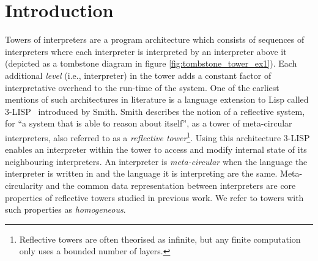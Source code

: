 \documentclass[sigplan,anonymous,review]{acmart}
\theoremstyle{definition}
\begin{document}



\maketitle

\section{Introduction}
Towers of interpreters are a program architecture which consists of sequences of interpreters where each interpreter is interpreted by an interpreter above it (depicted as a tombstone diagram in figure \ref{fig:tombstone_tower_ex1}). Each additional \textit{level} (i.e., interpreter) in the tower adds a constant factor of interpretative overhead to the run-time of the system. One of the earliest mentions of such architectures in literature is a language extension to Lisp called 3-LISP~\cite{smith1984reflection} introduced by Smith. Smith describes the notion of a reflective system, for ``a system that is able to reason
about itself'', as a tower of meta-circular interpreters, also referred to as a \textit{reflective tower}\footnote{
Reflective towers are often theorised as infinite, but any finite
computation only uses a bounded number of layers.}.
Using this architecture 3-LISP enables an interpreter within the tower to access and modify internal state of its neighbouring interpreters. An interpreter is \textit{meta-circular} when the language the interpreter is written in and the language it is interpreting are the same. Meta-circularity and the common data representation between interpreters are core properties of reflective towers studied in previous work. We refer to towers with such properties as \textit{homogeneous}.
\end{document}
